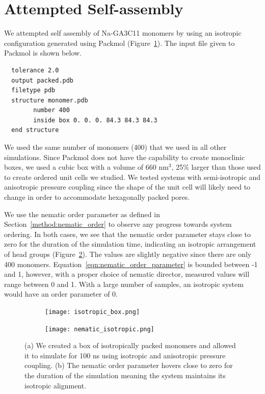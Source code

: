 \documentclass{article}
\begin{document}
  \clearpage
  
  \section{Attempted Self-assembly}\label{section:self_assembly}
  
  We attempted self assembly of Na-GA3C11 monomers by using an isotropic configuration
  generated using Packmol \cite{martinez_packmol:_2009} (Figure~\ref{fig:isotropic_box}).
  The input file given to Packmol is shown below.
  
  \lstset{language=bash}
  \begin{lstlisting}
  tolerance 2.0
  output packed.pdb
  filetype pdb
  structure monomer.pdb
  		number 400
  		inside box 0. 0. 0. 84.3 84.3 84.3
  end structure
  \end{lstlisting}

  We used the same number of monomers (400) that we used in all other simulations. 
  Since Packmol does not have the capability to create monoclinic boxes, we used a cubic
  box with a volume of 660 nm$^3$, 25\% larger than those used to create ordered unit
  cells we studied. We tested systems with semi-isotropic and anisotropic pressure 
  coupling since the shape of the unit cell will likely need to change in order to 
  accommodate hexagonally packed pores.
  
  We use the nematic order parameter as defined in Section~\ref{method:nematic_order} to 
  observe any progress towards system ordering. In both cases, we see that the nematic
  order parameter stays close to zero for the duration of the simulation time, indicating
  an isotropic arrangement of head groups (Figure~\ref{fig:nematic_isotropic}). The values
  are slightly negative since there are only 400 monomers. 
  Equation~\ref{eqn:nematic_order_parameter} is bounded between -1 and 1, however, with a
  proper choice of nematic director, measured values will range between 0 and 1. With a 
  large number of samples, an isotropic system would have an order parameter of 0.
  
  \begin{figure}[!htb]
  \centering
  \begin{subfigure}{0.45\textwidth}
  \texttt{[image: isotropic\_box.png]}
  \caption{}\label{fig:isotropic_box}
  \end{subfigure}
  \begin{subfigure}{0.45\textwidth}
  \texttt{[image: nematic\_isotropic.png]}
  \caption{}\label{fig:nematic_isotropic}
  \end{subfigure}
  \caption{(a) We created a box of isotropically packed monomers and allowed it to simulate
  for 100 ns using isotropic and anisotropic pressure coupling. (b) The nematic order 
  parameter hovers close to zero for the duration of the simulation meaning the system
  maintains its isotropic alignment.}\label{fig:self_assembly}
  \end{figure}
  
\end{document}
